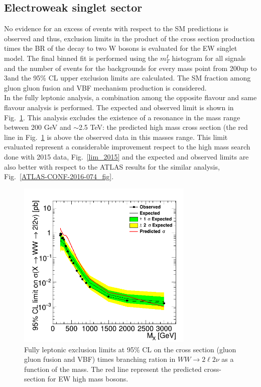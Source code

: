 \subsection*{Electroweak singlet sector}
No evidence for an excess of events with respect to the SM predictions  is observed and thus, exclusion
limits in the product of the cross section production times the BR of the decay to two W bosons is evaluated for the EW singlet model.
The final binned fit is performed using the $m_T^I$ histogram for all signals and the number of events for the backgrounds for every mass point from
200\GeV up to 3\TeV and the 95\% CL upper exclusion limits are calculated. The SM fraction among gluon gluon fusion and VBF mechanism production is considered.\\
\newline
In the fully leptonic analysis, a combination among the opposite flavour and same flavour analysis is performed. 
The expected and observed limit is shown in Fig.~\ref{fig:lim_OFSF_comb}. 
This analysis excludes the existence of a resonance in the mass range between 200 GeV and $\sim$2.5 TeV: 
the predicted high mass cross section (the red line in Fig.~\ref{fig:lim_OFSF_comb} is above the observed data in this masses range.
This limit evaluated represent a considerable improvement respect to the high mass search done with 2015 data, Fig.~\ref{lim_2015} 
and the expected and observed limits are also better with respect to the ATLAS results for the similar analysis, Fig.~\ref{ATLAS-CONF-2016-074_fig}.\\
\begin{figure}[htb]
\centering
\includegraphics[width=0.75\textwidth]{../AN/Figs/unblinding/Limits/c2_FullComb_unbl.png}
\caption{Fully leptonic  exclusion limits at 95$\%$ CL on the cross section (gluon gluon fusion and VBF) times branching ration in $WW \to 2\ell 2\nu$ 
as a function of the mass. The red line represent the predicted cross-section for EW high mass bosons.}
\label{fig:lim_OFSF_comb}
\end{figure}



